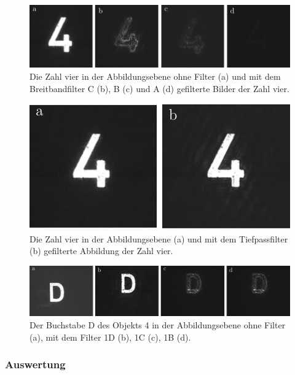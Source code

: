 \begin{figure}[h]
	\centering
	\includegraphics{images/Regina/abb22.pdf}
	\caption[Zahl 4 mit Breitbandfiltern]{
		Die Zahl vier in  der Abbildungsebene ohne Filter (a) und mit dem Breitbandfilter C (b), B (c) und A (d) gefilterte Bilder der Zahl vier.
	}
	\label{fig:vier_mit_breitband}
\end{figure}

\begin{figure}[h]
	\centering
	\includegraphics{images/Regina/abb23.pdf}
	\caption[Zahl 4 mit Tiefpassfilter]{
		Die Zahl vier in der Abbildungsebene (a) und mit dem Tiefpassfilter (b) gefilterte Abbildung der Zahl vier.
	}
	\label{fig:vier_mit_tiefpass}
\end{figure}

\begin{figure}[h]
	\centering
	\includegraphics{images/ergebniss_D/abb.pdf}
	\caption{
		Der Buchstabe D des Objekts 4 in der Abbildungsebene ohne Filter (a), mit dem Filter 1D (b), 1C (c), 1B (d).
	}
	\label{fig:example10_Filter1B}
\end{figure}


\subsubsection*{Auswertung}

